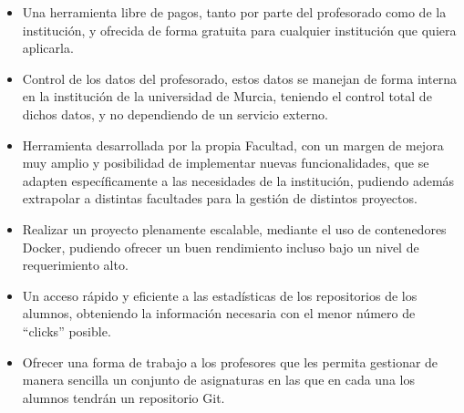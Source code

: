 \begin{itemize}
\item Una herramienta libre de pagos, tanto por parte del profesorado como
  de la institución, y ofrecida de forma gratuita para cualquier
  institución que quiera aplicarla.
\item Control de los datos del profesorado, estos datos se manejan de forma
  interna en la institución de la universidad de Murcia, teniendo el
  control total de dichos datos, y no dependiendo de un servicio externo.
\item Herramienta desarrollada por la propia Facultad, con un margen de
  mejora muy amplio y posibilidad de implementar nuevas funcionalidades,
  que se adapten específicamente a las necesidades de la institución,
  pudiendo además extrapolar a distintas facultades para la gestión de
  distintos proyectos.
\item Realizar un proyecto plenamente escalable, mediante el uso de
  contenedores Docker, pudiendo ofrecer un buen rendimiento incluso bajo un
  nivel de requerimiento alto.
\item Un acceso rápido y eficiente a las estadísticas de los repositorios
  de los alumnos, obteniendo la información necesaria con el menor número
  de ``clicks'' posible.
\item Ofrecer una forma de trabajo a los profesores que les permita
  gestionar de manera sencilla un conjunto de asignaturas en las que en
  cada una los alumnos tendrán un repositorio Git.
\end{itemize}


